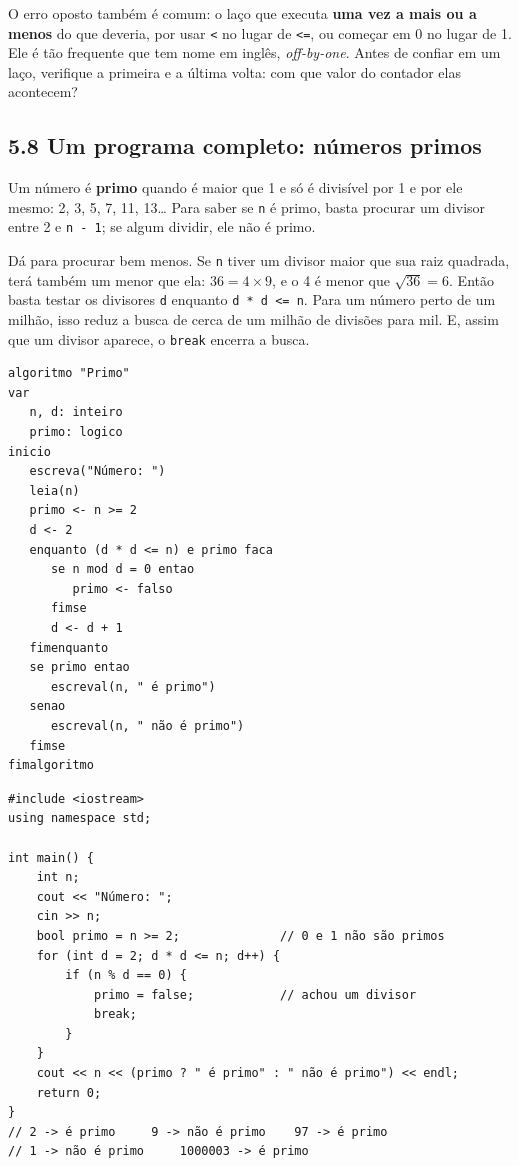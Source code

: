 O erro oposto também é comum: o laço que executa \textbf{uma vez a mais ou a menos} do que deveria, por usar \texttt{<} no lugar de \texttt{<=}, ou começar em 0 no lugar de 1. Ele é tão frequente que tem nome em inglês, \textit{off-by-one}. Antes de confiar em um laço, verifique a primeira e a última volta: com que valor do contador elas acontecem?

\subsection{5.8 Um programa completo: números primos}

Um número é \textbf{primo} quando é maior que 1 e só é divisível por 1 e por ele mesmo: 2, 3, 5, 7, 11, 13\ldots{} Para saber se \texttt{n} é primo, basta procurar um divisor entre 2 e \texttt{n - 1}; se algum dividir, ele não é primo.

Dá para procurar bem menos. Se \texttt{n} tiver um divisor maior que sua raiz quadrada, terá também um menor que ela: $36 = 4 \times 9$, e o 4 é menor que $\sqrt{36} = 6$. Então basta testar os divisores \texttt{d} enquanto \texttt{d * d <= n}. Para um número perto de um milhão, isso reduz a busca de cerca de um milhão de divisões para mil. E, assim que um divisor aparece, o \texttt{break} encerra a busca.

\begin{codigo}
\begin{Verbatim}[breaklines=true, breaksymbolleft={}, fontsize=\footnotesize]
algoritmo "Primo"
var
   n, d: inteiro
   primo: logico
inicio
   escreva("Número: ")
   leia(n)
   primo <- n >= 2
   d <- 2
   enquanto (d * d <= n) e primo faca
      se n mod d = 0 entao
         primo <- falso
      fimse
      d <- d + 1
   fimenquanto
   se primo entao
      escreval(n, " é primo")
   senao
      escreval(n, " não é primo")
   fimse
fimalgoritmo
\end{Verbatim}
\end{codigo}

\begin{codigo}
\begin{Verbatim}[breaklines=true, breaksymbolleft={}, fontsize=\footnotesize]
#include <iostream>
using namespace std;

int main() {
    int n;
    cout << "Número: ";
    cin >> n;
    bool primo = n >= 2;              // 0 e 1 não são primos
    for (int d = 2; d * d <= n; d++) {
        if (n % d == 0) {
            primo = false;            // achou um divisor
            break;
        }
    }
    cout << n << (primo ? " é primo" : " não é primo") << endl;
    return 0;
}
// 2 -> é primo     9 -> não é primo    97 -> é primo
// 1 -> não é primo     1000003 -> é primo
\end{Verbatim}
\end{codigo}

